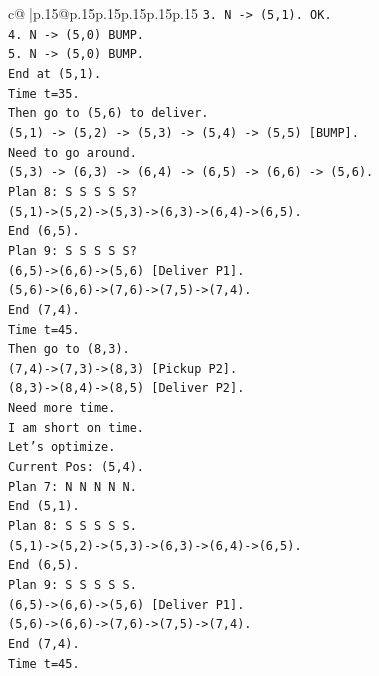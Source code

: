 \documentclass{article}
\begin{document}
{\begin{supertabular}{c@{$\;$}|p{.15\linewidth}@{}p{.15\linewidth}p{.15\linewidth}p{.15\linewidth}p{.15\linewidth}p{.15\linewidth}}
{{{\texttt{3. N {-}> (5,1). OK.} \\
\texttt{4. N {-}> (5,0) BUMP.} \\
\texttt{5. N {-}> (5,0) BUMP.} \\
\texttt{End at (5,1).} \\
\texttt{Time t=35.} \\
\texttt{Then go to (5,6) to deliver.} \\
\texttt{(5,1) {-}> (5,2) {-}> (5,3) {-}> (5,4) {-}> (5,5) {[}BUMP{]}.} \\
\texttt{Need to go around.} \\
\texttt{(5,3) {-}> (6,3) {-}> (6,4) {-}> (6,5) {-}> (6,6) {-}> (5,6).} \\
\texttt{Plan 8: S S S S S?} \\
\texttt{(5,1){-}>(5,2){-}>(5,3){-}>(6,3){-}>(6,4){-}>(6,5).} \\
\texttt{End (6,5).} \\
\texttt{Plan 9: S S S S S?} \\
\texttt{(6,5){-}>(6,6){-}>(5,6) {[}Deliver P1{]}.} \\
\texttt{(5,6){-}>(6,6){-}>(7,6){-}>(7,5){-}>(7,4).} \\
\texttt{End (7,4).} \\
\texttt{Time t=45.} \\
\texttt{Then go to (8,3).} \\
\texttt{(7,4){-}>(7,3){-}>(8,3) {[}Pickup P2{]}.} \\
\texttt{(8,3){-}>(8,4){-}>(8,5) {[}Deliver P2{]}.} \\
\texttt{Need more time.} \\
\texttt{I am short on time.} \\
\texttt{Let's optimize.} \\
\texttt{Current Pos: (5,4).} \\
\texttt{Plan 7: N N N N N.} \\
\texttt{End (5,1).} \\
\texttt{Plan 8: S S S S S.} \\
\texttt{(5,1){-}>(5,2){-}>(5,3){-}>(6,3){-}>(6,4){-}>(6,5).} \\
\texttt{End (6,5).} \\
\texttt{Plan 9: S S S S S.} \\
\texttt{(6,5){-}>(6,6){-}>(5,6) {[}Deliver P1{]}.} \\
\texttt{(5,6){-}>(6,6){-}>(7,6){-}>(7,5){-}>(7,4).} \\
\texttt{End (7,4).} \\
\texttt{Time t=45.} \\
}}}
\end{supertabular}}
\end{document}
